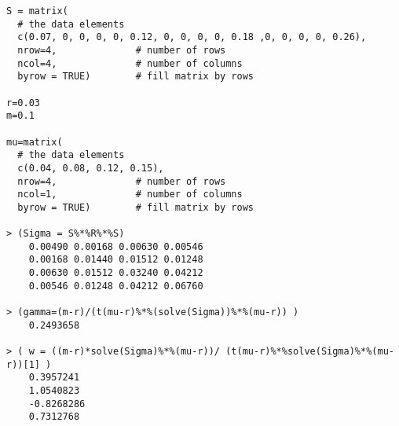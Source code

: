 \documentclass[11pt,oneside,a4paper, titlepage]{article}
\begin{document}
\begin{enumerate}
\begin{enumerate}
\begin{verbatim}
S = matrix( 
  # the data elements 
  c(0.07, 0, 0, 0, 0, 0.12, 0, 0, 0, 0, 0.18 ,0, 0, 0, 0, 0.26),
  nrow=4,              # number of rows 
  ncol=4,              # number of columns 
  byrow = TRUE)        # fill matrix by rows 

r=0.03
m=0.1

mu=matrix(
  # the data elements
  c(0.04, 0.08, 0.12, 0.15),
  nrow=4,              # number of rows 
  ncol=1,              # number of columns 
  byrow = TRUE)        # fill matrix by rows 

> (Sigma = S%*%R%*%S)
	0.00490 0.00168 0.00630 0.00546
	0.00168 0.01440 0.01512 0.01248
	0.00630 0.01512 0.03240 0.04212
	0.00546 0.01248 0.04212 0.06760

> (gamma=(m-r)/(t(mu-r)%*%(solve(Sigma))%*%(mu-r)) )
	0.2493658
	
> ( w = ((m-r)*solve(Sigma)%*%(mu-r))/ (t(mu-r)%*%solve(Sigma)%*%(mu-r))[1] )
	0.3957241
	1.0540823
	-0.8268286
	0.7312768
\end{verbatim}


\end{enumerate}
\end{enumerate}
\end{document}
